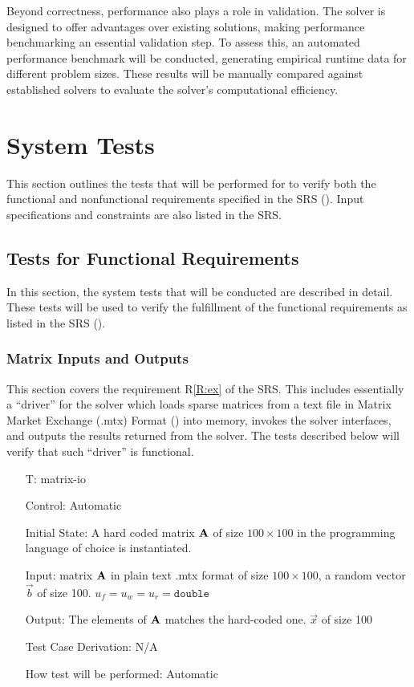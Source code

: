 \documentclass[12pt, titlepage]{article}
\newcounter{testnum} %
\newcommand{\rref}[1]{R\ref{#1}}
\begin{document}
Beyond correctness, performance also plays a role in validation. The solver is
designed to offer advantages over existing solutions, making performance
benchmarking an essential validation step. To assess this, an automated
performance benchmark will be conducted, generating empirical runtime data for
different problem sizes. These results will be manually compared against
established solvers to evaluate the solver’s computational efficiency.

\section{System Tests}
\label{sec:system-tests}

This section outlines the tests that will be performed for \progname{} to verify
both the functional and nonfunctional requirements specified in the SRS
(\cite{SRS}). Input specifications and constraints are also listed in the SRS.

\subsection{Tests for Functional Requirements}
\label{sec:tests-funct-requ}

In this section, the system tests that will be conducted are described in
detail. These tests will be used to verify the fulfillment of the functional
requirements as listed in the SRS (\cite{SRS}).

\subsubsection{Matrix Inputs and Outputs}

This section covers the requirement \rref{R:ex} of the SRS. This includes
essentially a ``driver'' for the solver which loads sparse matrices from a text
file in Matrix Market Exchange (.mtx) Format (\cite{noauthor_matrix_2013}) into memory,
invokes the solver interfaces, and outputs the results returned from the solver.
The tests described below will verify that such ``driver'' is functional.

\begin{itemize}

\item[T\refstepcounter{testnum}\thetestnum \label{T:io}:]{matrix-io}

Control: Automatic

Initial State: A hard coded matrix \(\mathbf{A}\) of size \(\num{100} \times
\num{100}\) in the programming language of choice is instantiated.

Input: matrix \(\mathbf{A}\) in plain text .mtx format of size \(\num{100} \times
\num{100}\), a random vector \(\vec{b}\) of size \num{100}. \(u_f = u_w = u_r =
\texttt{double}\)

Output: The elements of \(\mathbf{A}\) matches the hard-coded one. \(\vec{x}\) of size
\num{100}

Test Case Derivation: N/A

How test will be performed: Automatic

\end{itemize}
\end{document}
